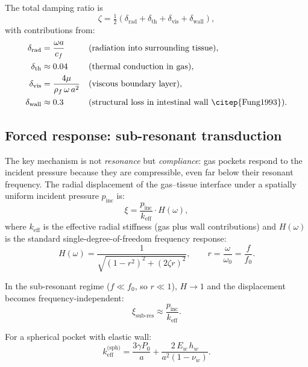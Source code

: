 \documentclass[12pt]{article}
\begin{document}
The total damping ratio is
\begin{equation}
  \zeta = \tfrac{1}{2}(\delta_\text{rad} + \delta_\text{th}
          + \delta_\text{vis} + \delta_\text{wall}),
  \label{eq:damping}
\end{equation}
with contributions from:
\begin{align}
  \delta_\text{rad}  &= \frac{\omega a}{c_f}
    && \text{(radiation into surrounding tissue)}, \\
  \delta_\text{th}   &\approx 0.04
    && \text{(thermal conduction in gas)}, \\
  \delta_\text{vis}  &= \frac{4\mu}{\rho_f\,\omega\,a^2}
    && \text{(viscous boundary layer)}, \\
  \delta_\text{wall} &\approx 0.3
    && \text{(structural loss in intestinal wall \citep{Fung1993})}.
\end{align}


\subsection{Forced response: sub-resonant transduction}
\label{sec:forced}

The key mechanism is not \emph{resonance} but \emph{compliance}: gas
pockets respond to the incident pressure because they are compressible,
even far below their resonant frequency.  The radial displacement of the
gas--tissue interface under a spatially uniform incident pressure
$p_\text{inc}$ is:
\begin{equation}
  \xi = \frac{p_\text{inc}}{k_\text{eff}} \cdot H(\omega),
  \label{eq:forced}
\end{equation}
where $k_\text{eff}$ is the effective radial stiffness (gas plus wall
contributions) and $H(\omega)$ is the standard single-degree-of-freedom
frequency response:
\begin{equation}
  H(\omega) = \frac{1}{\sqrt{(1 - r^2)^2 + (2\zeta r)^2}}, \qquad
  r = \frac{\omega}{\omega_0} = \frac{f}{f_0}.
  \label{eq:H}
\end{equation}

In the sub-resonant regime ($f \ll f_0$, so $r \ll 1$), $H \to 1$ and the
displacement becomes frequency-independent:
\begin{equation}
  \xi_\text{sub-res} \approx \frac{p_\text{inc}}{k_\text{eff}}.
  \label{eq:subresonant}
\end{equation}

For a spherical pocket with elastic wall:
\begin{equation}
  k_\text{eff}^\text{(sph)} = \frac{3\gamma P_0}{a}
    + \frac{2\,E_w\,h_w}{a^2(1-\nu_w)}.
  \label{eq:keff_sphere}
\end{equation}
\end{document}
